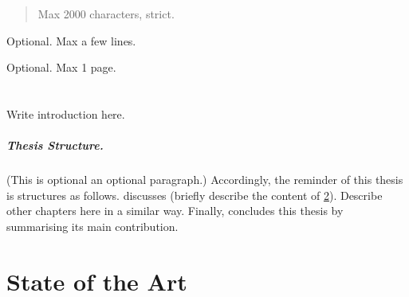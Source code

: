 \documentclass[12pt,a4paper,openright,twoside]{book}
\begin{document}
	
\frontmatter



\begin{abstract}	
Max 2000 characters, strict.
\end{abstract}

\begin{dedication} %
Optional. Max a few lines.
\end{dedication}

\begin{acknowledgements} %
Optional. Max 1 page.
\end{acknowledgements}

\tableofcontents   
\listoffigures     %
\lstlistoflistings %

\mainmatter

\chapter{\introductionname}
\label{chap:introduction}

Write introduction here.

%
\paragraph{Thesis Structure.} %
%

(This is optional an optional paragraph.)
%
Accordingly, the reminder of this thesis is structures as follows.
%
 discusses (briefly describe the content of \cref{chap:background}).
%
Describe other chapters here in a similar way.
%
Finally,  concludes this thesis by summarising its main contribution.

\chapter{State of the Art} %
\label{chap:background}
\end{document}
